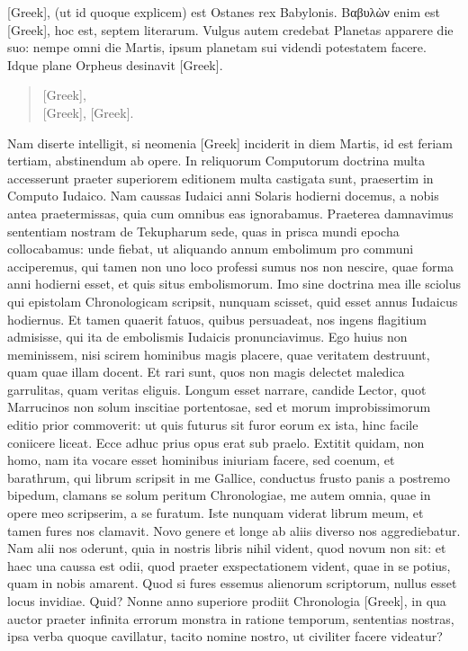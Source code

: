 \textgreek{[Greek]}, (ut id quoque explicem) est Ostanes rex Babylonis.
\textgreek{Βαβυλὼν} enim est \textgreek{[Greek]},
 hoc est, septem literarum.
Vulgus autem credebat Planetas apparere die suo: nempe omni
die Martis, ipsum planetam sui videndi potestatem facere.
Idque plane Orpheus desinavit \textgreek{[Greek]}.
\begin{quote}
\textgreek{[Greek]},\\
\textgreek{[Greek]}, \textgreek{[Greek]}.
\end{quote}
Nam diserte intelligit, si neomenia \textgreek{[Greek]} inciderit in diem
Martis, id est feriam tertiam, abstinendum ab opere.
In reliquorum
Computorum doctrina multa accesserunt praeter superiorem editionem
multa castigata sunt, praesertim in Computo Iudaico.
Nam
caussas Iudaici anni Solaris hodierni docemus, a nobis antea praetermissas,
quia cum omnibus eas ignorabamus.
Praeterea damnavimus sententiam nostram de Tekupharum sede, quas in prisca
mundi epocha collocabamus: unde fiebat, ut aliquando annum
embolimum pro communi acciperemus, qui tamen non uno loco
professi sumus nos non nescire, quae forma anni hodierni esset, et
quis situs embolismorum.
Imo sine doctrina mea ille sciolus qui
epistolam Chronologicam scripsit, nunquam scisset, quid esset
annus Iudaicus hodiernus.
Et tamen quaerit fatuos, quibus persuadeat,
nos ingens flagitium admisisse, qui ita de embolismis Iudaicis
pronunciavimus.
Ego huius non meminissem, nisi scirem hominibus
magis placere, quae veritatem destruunt, quam quae illam docent.
Et rari sunt, quos non magis delectet maledica garrulitas,
quam veritas eliguis.
Longum esset narrare, candide Lector,
quot Marrucinos non solum inscitiae portentosae, sed et morum
improbissimorum editio prior commoverit: ut quis futurus sit furor
eorum ex ista, hinc facile coniicere liceat.
Ecce adhuc prius opus erat sub praelo.
Extitit quidam, non homo, nam ita vocare esset
hominibus iniuriam facere, sed coenum, et barathrum, qui librum
scripsit in me Gallice, conductus frusto panis a postremo bipedum,
clamans se solum peritum Chronologiae, me autem omnia, quae
in opere meo scripserim, a se furatum.
Iste nunquam viderat librum
meum, et tamen fures nos clamavit.
Novo genere et longe ab
aliis diverso nos aggrediebatur.
Nam alii nos oderunt, quia in
nostris libris nihil vident, quod novum non sit: et haec una caussa
est odii, quod praeter exspectationem vident, quae in se potius, quam
in nobis amarent.
Quod si fures essemus alienorum scriptorum, nullus
esset locus invidiae.
Quid?
{}
Nonne anno superiore prodiit Chronologia
\textgreek{[Greek]}, in qua auctor praeter infinita errorum monstra
in ratione temporum, sententias nostras, ipsa verba quoque cavillatur,
tacito nomine nostro, ut civiliter facere videatur?

